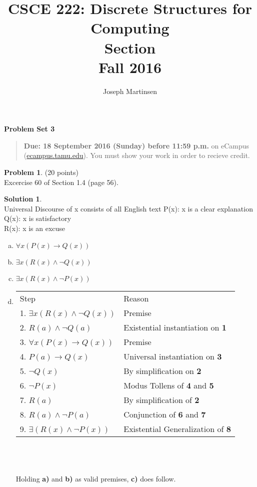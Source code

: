 \documentclass{article}
\title{CSCE 222: Discrete Structures for Computing\\Section \mysectionnumber\\Fall 2016}
\author{Joseph Martinsen}
\theoremstyle{definition}
\newtheorem{problem}{Problem}
\newtheorem*{solution}{Solution}
\newcommand{\problemset}[1]{\begin{center}\textbf{Problem Set #1}\end{center}}
\newcommand{\duedate}[1]{\begin{quote}\textbf{Due: #1} on eCampus (\url{ecampus.tamu.edu}). You must show your work in order to recieve credit.\end{quote}}
\begin{document}
\maketitle

\problemset{3}

\duedate{18 September 2016 (Sunday) before 11:59 p.m.}

\bigskip

\begin{problem} (20 points)\\
Excercise 60 of Section 1.4 (page 56).
\end{problem}

\begin{solution}\ \\
Universal Discourse of x consists of all English text
P(x): x is a clear explanation\\
Q(x): x is satisfactory\\
R(x): x is an excuse\\
\begin{enumerate}[a)] %
\item %
$\forall x(P(x) \rightarrow Q(x))$

\item
$\exists x(R(x) \wedge \neg Q(x))$

\item
$\exists x(R(x) \wedge \neg P(x))$

\item
\begin{tabular}{ll}
Step & Reason \\
1. $\exists x(R(x) \wedge \neg Q(x))$ & Premise \\
2. $R(a) \wedge \neg Q(a)$            & Existential instantiation on \bf{1} \\
3. $\forall x(P(x) \rightarrow Q(x))$ & Premise \\
4. $P(a) \rightarrow Q(x)$            & Universal instantiation on \bf{3} \\
5. $\neg Q(x)$                        & By simplification on \bf{2} \\
6. $\neg P(x)$                        & Modus Tollens of \textbf{4} and \bf{5} \\
7. $R(a)$                             & By simplification of \bf{2} \\
8. $R(a) \wedge \neg P(a)$            & Conjunction of \textbf{6} and \bf{7} \\
9. $\exists (R(x) \wedge \neg P(x))$  & Existential Generalization of \bf{8}
\end{tabular} \\ \ \\ \ \\
Holding \textbf{a)} and \textbf{b)} as valid premises, \textbf{c)} does follow.

\end{enumerate}



\end{solution}
\end{document}
